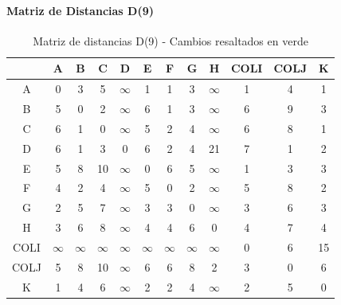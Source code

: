 \documentclass[12pt]{article}
\begin{document}
\paragraph{Matriz de Distancias D(9)}
\begin{table}[h!]
\centering
\begin{tabular}{|c|c|c|c|c|c|c|c|c|c|c|c|}
\hline
 & A & B & C & D & E & F & G & H & COLI & COLJ & K \\\hline
A & 0 & 3 & 5 & $\infty$ & 1 & 1 & 3 & $\infty$ & 1 & 4 & 1 \\\hline
B & 5 & 0 & 2 & $\infty$ & 6 & 1 & 3 & $\infty$ & 6 & 9 & 3 \\\hline
C & 6 & 1 & 0 & $\infty$ & 5 & 2 & 4 & $\infty$ & 6 & 8 & 1 \\\hline
D & 6 & 1 & 3 & 0 & 6 & 2 & 4 & 21 & 7 & 1 & 2 \\\hline
E & 5 & 8 & 10 & $\infty$ & 0 & 6 & 5 & $\infty$ & 1 & 3 & 3 \\\hline
F & 4 & 2 & 4 & $\infty$ & 5 & 0 & 2 & $\infty$ & 5 & 8 & 2 \\\hline
G & 2 & 5 & 7 & $\infty$ & 3 & 3 & 0 & $\infty$ & 3 & 6 & 3 \\\hline
H & 3 & 6 & 8 & $\infty$ & 4 & 4 & 6 & 0 & 4 & 7 & 4 \\\hline
COLI & $\infty$ & $\infty$ & $\infty$ & $\infty$ & $\infty$ & $\infty$ & $\infty$ & $\infty$ & 0 & 6 & 15 \\\hline
COLJ & 5 & 8 & 10 & $\infty$ & 6 & 6 & 8 & 2 & 3 & 0 & 6 \\\hline
K & 1 & 4 & 6 & $\infty$ & 2 & 2 & 4 & $\infty$ & 2 & 5 & 0 \\\hline
\end{tabular}
\caption{Matriz de distancias D(9) - Cambios resaltados en verde}
\end{table}
\end{document}

